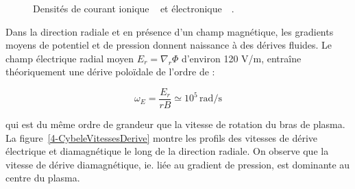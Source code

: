 \begin{refsection}
\begin{figure}[!htbp]
  \centering
    \caption{Densités de courant ionique
    ~ et électronique~~.}
    \label{4-CybeleCarteFlux}
\end{figure}
\newpage
Dans la direction radiale et en présence d'un champ magnétique, les gradients
moyens de potentiel et de pression donnent naissance à des dérives
fluides. 
Le champ électrique radial moyen $E_r=\nabla_r\Phi$ d'environ 120 V/m,
entraîne théoriquement une dérive poloïdale de l'ordre de :

\begin{equation}
\omega_E=\frac{E_r}{rB}\simeq10^5\,\text{rad/s} 
\end{equation}

qui est du même ordre de grandeur que la vitesse de rotation du bras de plasma.
La figure~\ref{4-CybeleVitessesDerive} montre les profils des vitesses
de dérive électrique et diamagnétique le long de la direction radiale. On
observe que la vitesse de dérive diamagnétique, ie. liée au gradient de pression, est dominante au centre du
plasma. 


\end{refsection}
